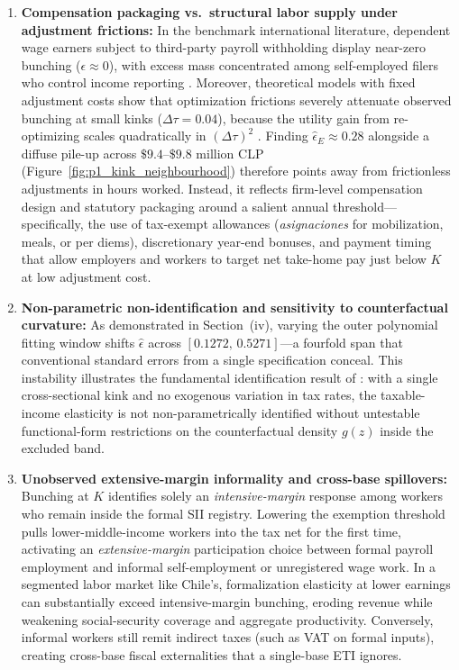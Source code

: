 \begin{enumerate}
    \item \textbf{Compensation packaging vs.\ structural labor supply under adjustment frictions:} In the benchmark international literature, dependent wage earners subject to third-party payroll withholding display near-zero bunching ($\epsilon \approx 0$), with excess mass concentrated among self-employed filers who control income reporting \parencite{saez2010taxpayers,saez2012elasticity}. Moreover, theoretical models with fixed adjustment costs show that optimization frictions severely attenuate observed bunching at small kinks ($\Delta\tau = 0.04$), because the utility gain from re-optimizing scales quadratically in $(\Delta\tau)^2$ \parencite{chetty2011adjustment}. Finding $\hat{\epsilon}_E \approx 0.28$ alongside a diffuse pile-up across $\$9.4$--$\$9.8$ million CLP (Figure~\ref{fig:p1_kink_neighbourhood}) therefore points away from frictionless adjustments in hours worked. Instead, it reflects firm-level compensation design and statutory packaging around a salient annual threshold---specifically, the use of tax-exempt allowances (\textit{asignaciones} for mobilization, meals, or per diems), discretionary year-end bonuses, and payment timing that allow employers and workers to target net take-home pay just below $K$ at low adjustment cost.

    \item \textbf{Non-parametric non-identification and sensitivity to counterfactual curvature:} As demonstrated in Section~(iv), varying the outer polynomial fitting window shifts $\hat{\epsilon}$ across $[0.1272,\, 0.5271]$---a fourfold span that conventional standard errors from a single specification conceal. This instability illustrates the fundamental identification result of \textcite{blomquist2021bunching}: with a single cross-sectional kink and no exogenous variation in tax rates, the taxable-income elasticity is not non-parametrically identified without untestable functional-form restrictions on the counterfactual density $g(z)$ inside the excluded band.

    \item \textbf{Unobserved extensive-margin informality and cross-base spillovers:} Bunching at $K$ identifies solely an \emph{intensive-margin} response among workers who remain inside the formal SII registry. Lowering the exemption threshold pulls lower-middle-income workers into the tax net for the first time, activating an \emph{extensive-margin} participation choice between formal payroll employment and informal self-employment or unregistered wage work. In a segmented labor market like Chile's, formalization elasticity at lower earnings can substantially exceed intensive-margin bunching, eroding revenue while weakening social-security coverage and aggregate productivity. Conversely, informal workers still remit indirect taxes (such as VAT on formal inputs), creating cross-base fiscal externalities that a single-base ETI ignores.


\end{enumerate}
